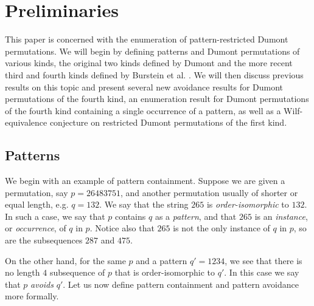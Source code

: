 \documentclass[
final
]{dmtcs-episciences}
\theoremstyle{definition}
\theoremstyle{remark}
\begin{document}



\section{Preliminaries}

This paper is concerned with the enumeration of pattern-restricted Dumont permutations. We will begin by defining patterns and Dumont permutations of various kinds, the original two kinds defined by Dumont \cite{Dumont} and the more recent third and fourth kinds defined by Burstein et al. \cite{Burstein_New}. We will then discuss previous results on this topic and present several new avoidance results for Dumont permutations of the fourth kind, an enumeration result for Dumont permutations of the fourth kind containing a single occurrence of a pattern, as well as a Wilf-equivalence conjecture on restricted Dumont permutations of the first kind.

\subsection {Patterns}


We begin with an example of pattern containment.  Suppose we are given a permutation, say $p=26483751$, and another permutation usually of shorter or equal length, e.g. $q=132$.  We say that the string $265$ is \emph{order-isomorphic} to $132$.  In such a case, we say that $p$ contains $q$ as a \emph{pattern}, and that $265$ is an \emph{instance}, or \emph{occurrence}, of $q$ in $p$.  Notice also that $265$ is not the only instance of $q$ in $p$, so are the subsequences $287$ and $475$. 

On the other hand, for the same $p$ and a pattern $q'=1234$,  we see that there is no length $4$ subsequence of $p$ that is order-isomorphic to $q'$. In this case we say that $p$ \emph{avoids} $q'$.  Let us now define pattern containment and pattern avoidance more formally.
\end{document}
